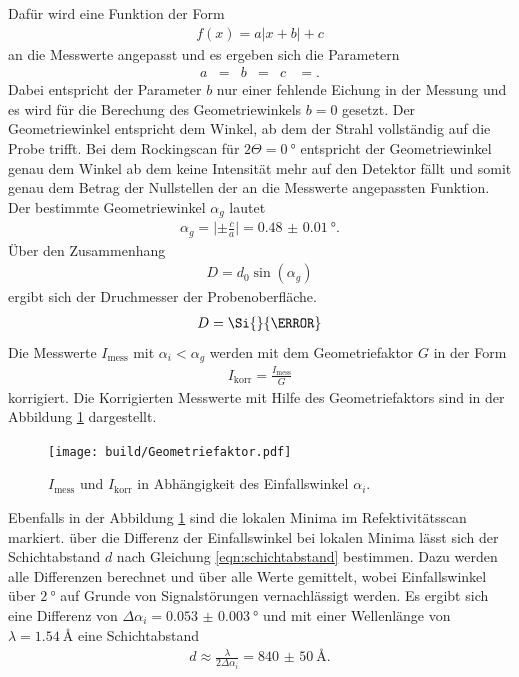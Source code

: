 Dafür wird eine Funktion der Form
\begin{align}
  f(x) = a \lvert x + b \rvert + c
\end{align}
an die Messwerte angepasst und es ergeben sich die Parametern
\begin{align}
a&= &b&=  &c&=.
\end{align}
Dabei entspricht der Parameter $b$ nur einer fehlende Eichung in der Messung und
es wird für die Berechung des Geometriewinkels $b=0$ gesetzt.
Der Geometriewinkel entspricht dem Winkel, ab dem der Strahl
vollständig auf die Probe trifft. Bei dem Rockingscan für $2\Theta=\SI{0}{\degree}$
entspricht der Geometriewinkel genau dem Winkel ab dem keine Intensität
mehr auf den Detektor fällt und somit genau dem Betrag der Nullstellen der an die Messwerte
angepassten Funktion.
Der bestimmte Geometriewinkel $\alpha_g$
lautet
\begin{align}
\alpha_g = \lvert \pm\frac{c}{a} \rvert = \SI{0.48(1)}{\degree}.
\end{align}
Über den Zusammenhang
\begin{align}
D = d_0\sin(\alpha_g)
\end{align}
ergibt sich der Druchmesser
der Probenoberfläche.
\begin{align}
  D=\Si{}{\meter}
\end{align}
Die Messwerte $I_{\mathrm{mess}}$ mit $\alpha_i < \alpha_g $ werden mit dem Geometriefaktor $G$
in der Form
\begin{align}
  I_{\mathrm{korr}} = \frac{I_{\mathrm{mess}}}{G}
\end{align}
korrigiert. Die Korrigierten Messwerte mit Hilfe des Geometriefaktors sind in der Abbildung \ref{fig:korr} dargestellt.
\begin{figure}
  \centering
  \texttt{[image: build/Geometriefaktor.pdf]}
  \caption{$I_{\mathrm{mess}}$ und $I_{\mathrm{korr}}$ in Abhängigkeit des Einfallswinkel $\alpha_i$.}
  \label{fig:korr}
\end{figure}

Ebenfalls in der Abbildung \ref{fig:korr}
sind die lokalen Minima im Refektivitätsscan markiert.
über die Differenz der Einfallswinkel bei lokalen Minima lässt
sich der Schichtabstand $d$ nach Gleichung \eqref{eqn:schichtabstand}
bestimmen.
Dazu werden alle Differenzen
berechnet und über alle Werte gemittelt, wobei Einfallswinkel
über $\SI{2}{\degree}$ auf Grunde von Signalstörungen vernachlässigt werden.
Es ergibt sich eine Differenz von $\Delta \alpha_i = \SI{0.053(3)}{\degree}$
und mit einer Wellenlänge von $\lambda=\SI{1.54}{\angstrom}$
eine Schichtabstand
\begin{align}
d \approx \frac{\lambda}{2\Delta\alpha_i} = \SI{840(50)}{\angstrom}.
\end{align}





%
